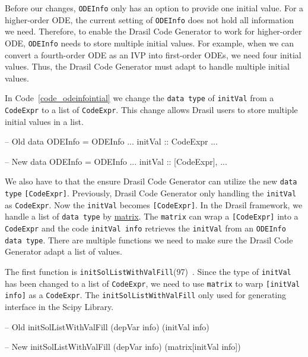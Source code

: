 Before our changes, \verb|ODEInfo| only has an option to provide one initial value. For a higher-order ODE, the current setting of \verb|ODEInfo| does not hold all information we need. Therefore, to enable the Drasil Code Generator to work for higher-order ODE, \verb|ODEInfo| needs to store multiple initial values. For example, when we can convert a fourth-order ODE as an IVP into first-order ODEs, we need four initial values. Thus, the Drasil Code Generator must adapt to handle multiple initial values.

In Code~\ref{code_odeinfointial} we change the \verb|data type| of \verb|initVal| from a \verb|CodeExpr| to a list of \verb|CodeExpr|. This change allows Drasil users to store multiple initial values in a list.
\begin{listing}[ht]
\begin{haskell1}
-- Old 
data ODEInfo = ODEInfo {
  ...
  initVal :: CodeExpr
  ...
}

-- New 
data ODEInfo = ODEInfo {
  ...
  initVal :: [CodeExpr],
  ...
}
\end{haskell1}
\label{code_odeinfointial}
\end{listing}

We also have to that the ensure Drasil Code Generator can utilize the new \verb|data type| \verb|[CodeExpr]|. Previously, Drasil Code Generator only handling the \verb|initVal| as \verb|CodeExpr|. Now the \verb|initVal| becomes \verb|[CodeExpr]|. In the Drasil framework, we handle a list of \verb|data type| by \href{https://jacquescarette.github.io/Drasil/docs/drasil-code-base-0.1.9.0/Language-Drasil-CodeExpr.html#v:matrix}{matrix}. The \verb|matrix| can wrap a \verb|[CodeExpr]| into a \verb|CodeExpr| and the code \verb|initVal info| retrieves the \verb|initVal| from an \verb|ODEInfo| \verb|data type|. There are multiple functions we need to make sure the Drasil Code Generator adapt a list of values. 

The first function is \verb|initSolListWithValFill|(97)~\citep{brooks}. Since the type of \verb|initVal| has been changed to a list of \verb|CodeExpr|, we need to use \verb|matrix| to warp \verb|[initVal info]| as a \verb|CodeExpr|. The \verb|initSolListWithValFill| only used for generating interface in the Scipy Library.
\begin{listing}[ht]
\begin{haskell1}
-- Old 
initSolListWithValFill (depVar info) (initVal info)

-- New 
initSolListWithValFill (depVar info) (matrix[initVal info]) 
\end{haskell1}
\end{listing}

